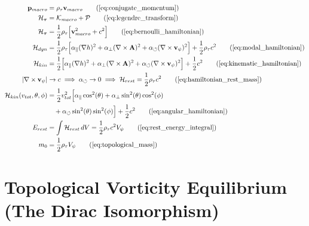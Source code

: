 \documentclass[11pt, a4paper]{article}
\begin{document}
\begin{tcolorbox}[recallbox, title={\ref{box:legendre_hamiltonian}. The Legendre Hamiltonian Translation}]
\begin{align}
    \mathbf{p}_{macro} &= \rho_{\tau} \mathbf{v}_{macro} \tag{\ref{eq:conjugate_momentum}} \\
    \mathcal{H}_{\boldsymbol{\tau}} &= \mathcal{K}_{macro} + \mathcal{P} \tag{\ref{eq:legendre_transform}} \\
    \mathcal{H}_{\boldsymbol{\tau}} &= \frac{1}{2} \rho_{\tau} \Big[ \mathbf{v}_{macro}^2 + c^2 \Big] \tag{\ref{eq:bernoulli_hamiltonian}} \\
    \mathcal{H}_{dyn} &= \frac{1}{2} \rho_{\tau} \Big[ \alpha_{\parallel}(\nabla h)^2 + \alpha_{\perp}(\nabla \times \mathbf{A})^2 + \alpha_{\circlearrowleft}(\nabla \times \mathbf{v}_{\psi})^2 \Big] + \frac{1}{2} \rho_{\tau} c^2 \tag{\ref{eq:modal_hamiltonian}} \\
    \mathcal{H}_{kin} &= \frac{1}{2} \Big[ \alpha_{\parallel}(\nabla h)^2 + \alpha_{\perp}(\nabla \times \mathbf{A})^2 + \alpha_{\circlearrowleft}(\nabla \times \mathbf{v}_{\psi})^2 \Big] + \frac{1}{2} c^2 \tag{\ref{eq:kinematic_hamiltonian}} \\
    |\nabla \times \mathbf{v}_{\psi}| &\to c \implies \alpha_{\circlearrowleft} \to 0 \implies \mathcal{H}_{rest} = \frac{1}{2}\rho_{\tau}c^2 \tag{\ref{eq:hamiltonian_rest_mass}} \\
    \mathcal{H}_{kin}(v_{tot}, \theta, \phi) &= \frac{1}{2} v_{tot}^2 \Big[ \alpha_{\parallel} \cos^2(\theta) + \alpha_{\perp} \sin^2(\theta)\cos^2(\phi) \nonumber \\
    &\quad + \alpha_{\circlearrowleft} \sin^2(\theta)\sin^2(\phi) \Big] + \frac{1}{2} c^2 \tag{\ref{eq:angular_hamiltonian}} \\
    E_{rest} &= \int \mathcal{H}_{rest} \, dV = \frac{1}{2} \rho_{\tau} c^2 V_{\psi} \tag{\ref{eq:rest_energy_integral}} \\
    m_0 &= \frac{1}{2} \rho_{\tau} V_{\psi} \tag{\ref{eq:topological_mass}}
\end{align}
\end{tcolorbox}







\section{Topological Vorticity Equilibrium (The Dirac Isomorphism)}
\label{sec:deriv_dirac_isomorphism}
\end{document}

